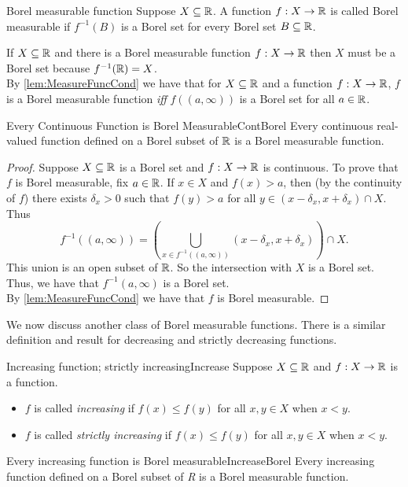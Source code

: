 \documentclass[twoside, openright, fontsize=10pt, headings=big]{scrbook}
\begin{document}
\begin{definition}{Borel measurable function}
    Suppose $X \subseteq\mathbb{R}$. A function $f : X \to\mathbb{R}$ is called Borel measurable if $f^{-1}(B)$ is a Borel set for every Borel set $B\subseteq\mathbb{R}$.
\end{definition}
If $X\subseteq\mathbb{R}$ and there is a Borel measurable function $f:X\to\mathbb{R}$ then $X$ must be a Borel set because $f^{-1}(\mathbb{R})=X$.\\
By \ref{lem:MeasureFuncCond} we have that for $X\subseteq\mathbb{R}$ and a function $f:X\to\mathbb{R}$, $f$ is a Borel measurable function \textit{iff} $f((a,\infty))$ is a Borel set for all $a\in\mathbb{R}$. 
\begin{theorem}{Every Continuous Function is Borel Measurable}{ContBorel}
    Every continuous real-valued function defined on a Borel subset of $\mathbb{R}$ is a Borel measurable function.
\end{theorem}
\begin{proof}
    Suppose $X \subseteq\mathbb{R}$ is a Borel set and $f : X \to \mathbb{R}$ is continuous. To prove that $f$ is Borel measurable, fix $a \in \mathbb{R}$.
    If $x \in X$ and $f(x) > a$, then (by the continuity of $f$) there exists $\delta_x>0$ such that $f(y)>a$ for all $y\in(x-\delta_x,x+\delta_x)\cap X$. Thus
    \[
        f^{-1}((a,\infty))=\left(\bigcup_{x\in f^{-1}((a,\infty))}(x-\delta_x,x+\delta_x)\right)\cap X.
    \]
    This union is an open subset of $\mathbb{R}$. So the intersection with $X$ is a Borel set. Thus, we have that $f^{-1}(a,\infty)$ is a Borel set.\\
    By \ref{lem:MeasureFuncCond} we have that $f$ is Borel measurable.
\end{proof}
We now discuss another class of Borel measurable functions. There is a similar definition and result for decreasing and strictly decreasing functions.
\begin{definition}{Increasing function; strictly increasing}{Increase}
    Suppose $X \subseteq\mathbb{R}$ and $f : X \to\mathbb{R}$ is a function.
    \begin{itemize}
        \item $f$ is called \textit{increasing} if $f(x)\leq f(y)$ for all $x,y\in X$ when $x<y$.
        \item $f$ is called \textit{strictly increasing} if $f(x)\leq f(y)$ for all $x,y\in X$ when $x<y$.
    \end{itemize}
\end{definition}
\begin{lemma}{Every increasing function is Borel measurable}{IncreaseBorel}
    Every increasing function defined on a Borel subset of \textit{R} is a Borel measurable function.
\end{lemma}
\end{document}
